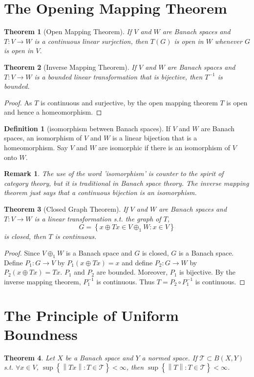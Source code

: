 \documentclass{article}
\newtheorem{theorem}{Theorem}[section]
\newtheorem*{remark}{Remark}
\theoremstyle{definition}
\newtheorem{definition}{Definition}[section]
\begin{document}
\section{The Opening Mapping Theorem}
\begin{theorem}[Open Mapping Theorem]
    If $V$ and $W$ are Banach spaces and $T:V\to W$ is a continuous linear surjection,
    then $T(G)$ is open in $W$ whenever $G$ is open in $V$.
\end{theorem}


\begin{theorem}[Inverse Mapping Theorem]
    If $V$ and $W$ are Banach spaces and $T:V\to W$ is a bounded linear transformation that is bijective,
    then $T^{-1}$ is bounded.
\end{theorem}
\begin{proof}
    As $T$ is continuous and surjective, by the open mapping theorem $T$ is open and hence a homeomorphism.
\end{proof}

\begin{definition}[isomorphism between Banach spaces]
    If $V$ and $W$ are Banach spaces, an isomorphism of $V$ and $W$ is a linear bijection that is a homeomorphism.
    Say $V$ and $W$ are isomorphic if there is an isomorphism of $V$ onto $W$.
\end{definition}
\begin{remark}
    The use of the word 'isomorphism' is counter to the spirit of category theory, but it is traditional in Banach 
    space theory. The inverse mapping theorem just says that a continuous bijection is an isomorphism.
\end{remark}


\begin{theorem}[Closed Graph Theorem]
    If $V$ and $W$ are Banach spaces and $T:V\to W$ is a linear transformation s.t. the graph of $T$,
    \[ G=\left\{x\oplus Tx\in V\oplus_1 W: x\in V\right\}\] 
    is closed, then $T$ is continuous.
\end{theorem}
\begin{proof}
    Since $V\oplus_1 W$ is a Banach space and $G$ is closed, $G$ is a Banach space.
    Define $P_1:G\to V$ by $P_1(x\oplus Tx)=x$ and define $P_2:G\to W$ by $P_2(x\oplus Tx)=Tx$. 
    $P_1$ and $P_2$ are bounded. Moreover, $P_1$ is bijective. By the inverse mapping theorem, $P_1^{-1}$ is continuous. 
    Thus $T=P_2\circ P_1^{-1}$ is continuous.
\end{proof}


\section{The Principle of Uniform Boundness}
\begin{theorem}
    Let $X$ be a Banach space and $Y$ a normed space. If $\mathcal{T}\subset B(X,Y)$ s.t. $\forall x\in V$,
    $\sup\left\{\left\|Tx\right\|:T\in \mathcal{T}\right\}<\infty$, then $\sup\left\{\left\|T\right\|:T\in\mathcal{T}\right\}<\infty$.
\end{theorem}
\end{document}
